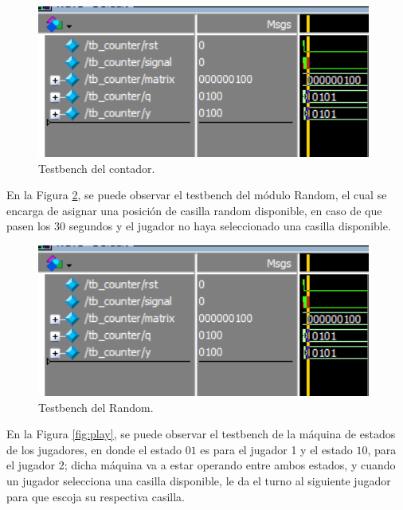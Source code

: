 \documentclass[journal,trans]{IEEEtran}
\begin{document}
	\begin{figure}[hbtp]
		\centering
		\includegraphics[width = \columnwidth]{imagenes/cou.png}
		\caption[Figura1]{Testbench del contador.}
		\label{fig:cou}
	\end{figure}
	
	En la Figura \ref{fig:ran}, se puede observar el testbench del módulo Random, el cual se encarga de asignar una posición de casilla random disponible, en caso de que pasen los 30 segundos y el jugador no haya seleccionado una casilla disponible.
	
	
	\begin{figure}[hbtp]
		\centering
		\includegraphics[width = \columnwidth]{imagenes/cou.png}
		\caption[Figura1]{Testbench del Random.}
		\label{fig:ran}
	\end{figure}
	
	En la Figura \ref{fig:play}, se puede observar el testbench de la máquina de estados de los jugadores, en donde el estado $01$ es para el jugador 1 y el estado $10$, para el jugador 2; dicha máquina va a estar operando entre ambos estados, y cuando un jugador selecciona una casilla disponible, le da el turno al siguiente jugador para que escoja su respectiva casilla.
	
\end{document}
